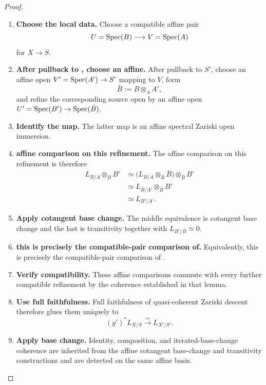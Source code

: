 \begin{proof}
\leavevmode
\begin{enumerate}[label=\textup{(\arabic*)}]
    \item \textbf{Choose the local data.}
    Choose a compatible affine pair
    \[
        U=\operatorname{Spec}(B)\longrightarrow V=\operatorname{Spec}(A)
    \]
    for \(X\to S\).

    \item \textbf{After pullback to , choose an affine.}
    After pullback to \(S'\), choose an affine open \(V'=\operatorname{Spec}(A')\to S'\) mapping to \(V\),
    form
    \[
        \bar B:=B\otimes_AA',
    \]
    and refine the corresponding source open by an affine open \(U'=\operatorname{Spec}(B')\to\operatorname{Spec}(\bar B)\).

    \item \textbf{Identify the map.}
    The latter map is an affine spectral Zariski open immersion.

    \item \textbf{affine comparison on this refinement.}
    The affine comparison on this refinement is therefore
    \[
    \begin{aligned}
        L_{B/A}\otimes_BB'
        &\simeq
        \bigl(L_{B/A}\otimes_B\bar B\bigr)
           \otimes_{\bar B}B'\\
        &\simeq
        L_{\bar B/A'}\otimes_{\bar B}B'\\
        &\simeq
        L_{B'/A'}.
    \end{aligned}
    \]

    \item \textbf{Apply cotangent base change.}
    The middle equivalence is cotangent base change and the last is transitivity together with
    \(L_{B'/\bar B}\simeq0\).

    \item \textbf{this is precisely the compatible-pair comparison of.}
    Equivalently, this is precisely the compatible-pair comparison of
    .

    \item \textbf{Verify compatibility.}
    These affine comparisons commute with every further compatible refinement by the coherence
    established in that lemma.

    \item \textbf{Use full faithfulness.}
    Full faithfulness of quasi-coherent Zariski descent therefore glues them uniquely to
    \[
        (g')^*L_{X/S}\xrightarrow{\simeq}L_{X'/S'}.
    \]

    \item \textbf{Apply base change.}
    Identity, composition, and iterated-base-change coherence are inherited from the affine
    cotangent base-change and transitivity constructions and are detected on the same affine
    basis.
\end{enumerate}
\end{proof}


